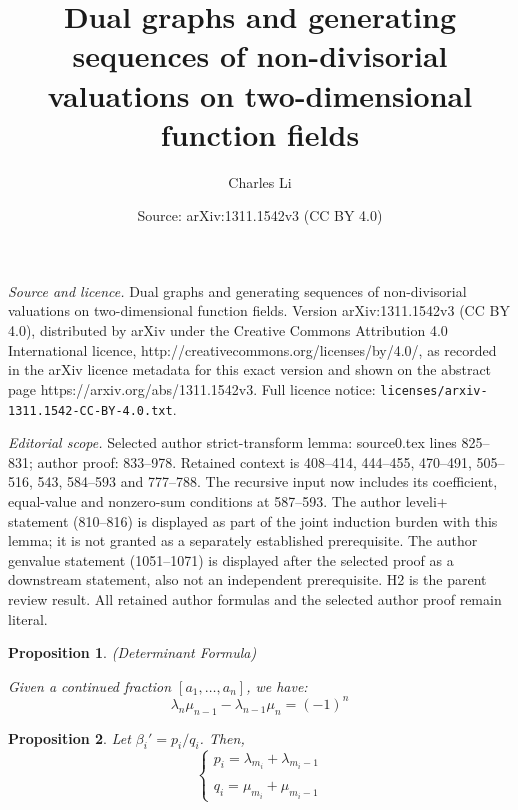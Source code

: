 \documentclass[10pt,a4paper]{amsart}
\title[Dual graphs and generating sequences]{Dual graphs and generating sequences of non-divisorial valuations on two-dimensional function fields}
\author{Charles Li}
\date{Source: arXiv:1311.1542v3 (CC BY 4.0)}
\newtheorem{prop}{Proposition}
\begin{document}
\maketitle

\noindent\emph{Source and licence.} Dual graphs and generating sequences of non-divisorial valuations on two-dimensional function fields. Version arXiv:1311.1542v3 (CC BY 4.0), distributed by arXiv under the Creative Commons Attribution 4.0 International licence, http://creativecommons.org/licenses/by/4.0/, as recorded in the arXiv licence metadata for this exact version and shown on the abstract page https://arxiv.org/abs/1311.1542v3. Full licence notice: \texttt{licenses/arxiv-1311.1542-CC-BY-4.0.txt}.\par\smallskip

\noindent\textit{Editorial scope.} Selected author strict-transform lemma: source0.tex lines 825--831; author proof: 833--978. Retained context is 408--414, 444--455, 470--491, 505--516, 543, 584--593 and 777--788. The recursive input now includes its coefficient, equal-value and nonzero-sum conditions at 587--593. The author leveli+ statement (810--816) is displayed as part of the joint induction burden with this lemma; it is not granted as a separately established prerequisite. The author genvalue statement (1051--1071) is displayed after the selected proof as a downstream statement, also not an independent prerequisite. H2 is the parent review result. All retained author formulas and the selected author proof remain literal.\par\smallskip
\begin{prop} \label{condet} (Determinant Formula)

Given a continued fraction $\displaystyle [a_1, \ldots, a_n]$, we have:
\begin{equation*}
\lambda_n\mu_{n-1}-\lambda_{n-1}\mu_n = (-1)^{n}
\end{equation*}
\end{prop}

\begin{prop} \label{pq}
Let $\beta_i'=p_i/q_i$. Then,
\begin{equation*}
\left\{
\begin{array}{l}
p_i=\lambda_{m_i} + \lambda_{m_i-1}
\\\\
q_i=\mu_{m_i} + \mu_{m_i-1}
\end{array}
\right.
\end{equation*}
\end{prop}
\end{document}
